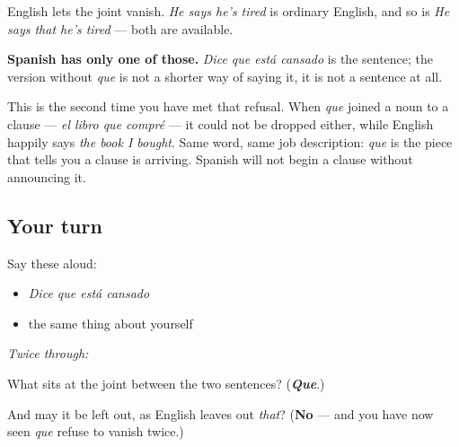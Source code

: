 \begin{culture}
English lets the joint vanish. \emph{He says he's tired} is ordinary English, and so is \emph{He says that he's tired} — both are available.

\textbf{Spanish has only one of those.} \emph{Dice que está cansado} is the sentence; the version without \emph{que} is not a shorter way of saying it, it is not a sentence at all.

This is the second time you have met that refusal. When \emph{que} joined a noun to a clause — \emph{el libro que compré} — it could not be dropped either, while English happily says \emph{the book I bought}. Same word, same job description: \emph{que} is the piece that tells you a clause is arriving. Spanish will not begin a clause without announcing it.
\end{culture}

\subsection*{Your turn}
Say these aloud:

\begin{itemize}
\raggedright
  \item \emph{Dice que está cansado}
  \item the same thing about yourself
\end{itemize}

\emph{Twice through:}

\begin{tcolorbox}[breakable,colback=teal!4,colframe=teal!35!black,title={Before you move on}]
What sits at the joint between the two sentences? (\emph{\textbf{Que}}.)

And may it be left out, as English leaves out \emph{that}? (\textbf{No} — and you have now seen \emph{que} refuse to vanish twice.)
\end{tcolorbox}
